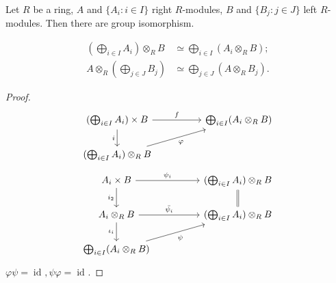 \documentclass{article}
\begin{document}
\begin{theorem}
    Let $R$ be a ring, $A$ and $\{A_{i}:i \in I\}$ right $R$-modules, $B$ and $\{B_{j}:j \in J\}$ left $R$-modules. Then there are group isomorphism.

    $$\begin{aligned}
    (\bigoplus_{i \in I} A_{i}) \otimes_R B &\simeq \bigoplus_{i \in I}(A_{i}\otimes_R B); \\
    A\otimes_R (\bigoplus_{j \in J} B_{j}) &\simeq \bigoplus_{j \in J} (A\otimes_R B_{j}).
    \end{aligned}$$
\end{theorem}
\begin{proof}
    $$\begin{tikzcd}
(\bigoplus_{i\in I}A_i)\times B \arrow[rr, "f"] \arrow[d, "i"'] &  & \bigoplus_{i\in I}(A_i\otimes_R B) \\
(\bigoplus_{i\in I}A_i)\otimes_R B \arrow[rru, "\varphi"']      &  &                                   
\end{tikzcd}$$
$$    \begin{tikzcd}
A_i\times B \arrow[rr, "\psi_i"] \arrow[d, "i_2"']              &  & (\bigoplus_{i\in I} A_i)\otimes_R B \arrow[d, equal] \\
A_i\otimes_R B \arrow[d, "\iota_i"'] \arrow[rr, "\bar{\psi_i}"] &  & (\bigoplus_{i\in I} A_i)\otimes_R B                                \\
\bigoplus_{i\in I}(A_i\otimes_R B) \arrow[rru, "\psi"']         &  &                                                                   
\end{tikzcd}$$
$\varphi \psi=\operatorname{id}_{}, \psi \varphi=\operatorname{id}_{}$.

\end{proof}
\end{document}
